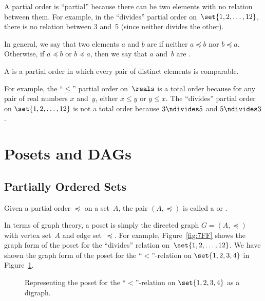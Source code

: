 A partial order is ``partial'' because there can be two elements with
no relation between them.  For example, in the ``divides'' partial
order on~$\set{1, 2, \dots, 12}$, there is no relation between 3 and~5
(since neither divides the other).

In general, we say that two elements $a$ and $b$ are
 if neither $a \preceq b$ nor $b \preceq a$.
Otherwise, if $a \preceq b$ or $b \preceq a$, then we say that $a$
and~$b$ are .

\begin{definition}\label{def:total_order}
A  is a partial order in which every pair of
distinct elements is comparable.
\end{definition}

For example, the ``$\le$'' partial order on~$\reals$ is a total order
because for any pair of real numbers $x$ and~$y$, either $x \le y$ or
$y \le x$.  The ``divides'' partial order on $\set{1, 2, \dots, 12}$
is not a total order because $3 \ndivides 5$ and $5 \ndivides 3$.

\section{Posets and DAGs}

\subsection{Partially Ordered Sets}

\begin{definition}\label{def:poset}
Given a partial order $\preceq$ on a set~$A$, the pair $(A, \preceq)$
is called a  or .
\end{definition}

In terms of graph theory, a poset is simply the directed graph $G =
(A, \preceq)$ with vertex set~$A$ and edge set~$\preceq$.  For example,
Figure~\ref{fig:7FF} shows the graph form of the poset for the
``divides'' relation on~$\set{1, 2, \dots, 12}$.  We have shown the
graph form of the poset for the ``$<$''-relation on $\set{1, 2, 3, 4}$
in Figure~\ref{fig:7FH}.

\begin{figure}



\caption{Representing the poset for the ``$<$''-relation on $\set{1,
    2, 3, 4}$ as a digraph.}

\label{fig:7FH}

\end{figure}

